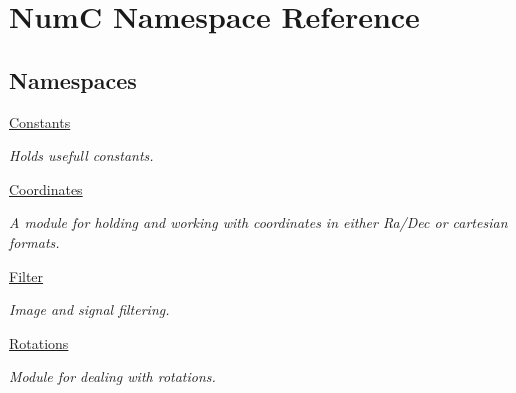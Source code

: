 \hypertarget{namespace_num_c}{}\section{NumC Namespace Reference}
\label{namespace_num_c}
\subsection*{Namespaces}
\begin{DoxyCompactItemize}
\item 
 \mbox{\hyperlink{namespace_num_c_1_1_constants}{Constants}}
\begin{DoxyCompactList}\small\item\em Holds usefull constants. \end{DoxyCompactList}\item 
 \mbox{\hyperlink{namespace_num_c_1_1_coordinates}{Coordinates}}
\begin{DoxyCompactList}\small\item\em A module for holding and working with coordinates in either Ra/\+Dec or cartesian formats. \end{DoxyCompactList}\item 
 \mbox{\hyperlink{namespace_num_c_1_1_filter}{Filter}}
\begin{DoxyCompactList}\small\item\em Image and signal filtering. \end{DoxyCompactList}\item 
 \mbox{\hyperlink{namespace_num_c_1_1_rotations}{Rotations}}
\begin{DoxyCompactList}\small\item\em Module for dealing with rotations. \end{DoxyCompactList}\end{DoxyCompactItemize}
